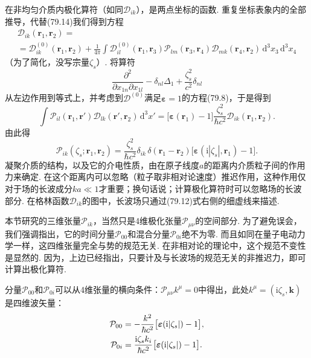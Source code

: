 在非均匀介质内极化算符（如同$\mathcal{D}_{ik}$），是两点坐标的函数. 重复坐标表象内的全部推导，代替(79.14)我们得到方程
\begin{equation*}
\begin{aligned}
\mathcal{D}_{ik}(\bm{r}_{1},\bm{r}_{2})={}\\
{}=\mathcal{D}_{ik}^{(0)}(\bm{r}_{1},\bm{r}_{2})+\frac{1}{4\pi}\int\mathcal{D}_{il}^{(0)}(\bm{r}_{1},\bm{r}_{3})\mathcal{P}_{lm}(\bm{r}_{3},\bm{r}_{4})\mathcal{D}_{mk}(\bm{r}_{4},\bm{r}_{2})\,\mathrm{d}^{3}x_{3}\,\mathrm{d}^{3}x_{4}
\end{aligned}
\end{equation*}
（为了简化，没写宗量$\zeta_{s}$）. 将算符
\begin{equation*}
\frac{\partial^{2}}{\partial x_{1n}\partial x_{1l}}-\delta_{nl}\Delta_{1}+\frac{\zeta_{s}^{2}}{c^{2}}\delta_{nl}
\end{equation*}
从左边作用到等式上，并考虑到$\mathcal{D}^{(0)}$满足$\bm{\varepsilon}=1$的方程(79.8)，于是得到
\begin{equation*}
\int\mathcal{P}_{il}(\bm{r}_{1},\bm{r}')\mathcal{D}_{lk}(\bm{r}',\bm{r}_{2})\,\mathrm{d}^{3}x'=\bigl[\bm{\varepsilon}(\bm{r}_{1})-1\bigr]\frac{\zeta_{s}^{2}}{\hbar c^{2}}\mathcal{D}_{ik}(\bm{r}_{1},\bm{r}_{2}).
\end{equation*}
由此得
\begin{equation}
\mathcal{P}_{ik}(\zeta_{s};\bm{r}_{1},\bm{r}_{2})=\frac{\zeta_{s}^{2}}{\hbar c^{2}}\delta_{ik}\,\delta(\bm{r}_{1}-\bm{r}_{2})\bigl[\bm{\varepsilon}(\mathrm{i}|\zeta_{s}|,\bm{r}_{1})-1\bigr].
\end{equation}
凝聚介质的结构，以及它的介电性质，由在原子线度$a$的距离内介质粒子间的作用力来确定. 在这个距离内可以忽略（粒子取非相对论速度）推迟作用，这种作用仅对于场的长波成分$ka\ll1$才重要；换句话说；计算极化算符时可以忽略场的长波部分. 在格林函数$\mathcal{D}_{ik}$的图中，长波场只通过(79.12)式右侧的细虚线来描述.

本节研究的三维张量$\mathcal{P}_{ik}$，当然只是4维极化张量$\mathcal{P}_{\mu\nu}$的空间部分. 为了避免误会，我们强调指出，它的时间分量$\mathcal{P}_{00}$和混合分量$\mathcal{P}_{0i}$绝不为零. 而且如同在量子电动力学一样，这四维张量完全与势的规范无关. 在非相对论的理论中，这个规范不变性是显然的. 因为，上边已经指出，只要计及与长波场的规范无关的非推迟力，即可计算出极化算符.

分量$\mathcal{P}_{00}$和$\mathcal{P}_{0i}$可以从4维张量的横向条件：$\mathcal{P}_{\mu\nu}k^{\mu}=0$中得出，此处$k^{\mu}=(\mathrm{i}\zeta_{s},\bm{k})$是四维波矢量：
\begin{align}
\mathcal{P}_{00}&=-\frac{k^{2}}{\hbar c^{2}}\bigl[\bm{\varepsilon}(\mathrm{i}|\zeta_{s}|)-1\bigr],\notag\\
\mathcal{P}_{0i}&=\frac{\mathrm{i}\zeta_{s}k_{i}}{\hbar c^{2}}\bigl[\bm{\varepsilon}(\mathrm{i}|\zeta_{s}|)-1\bigr].
\end{align}

